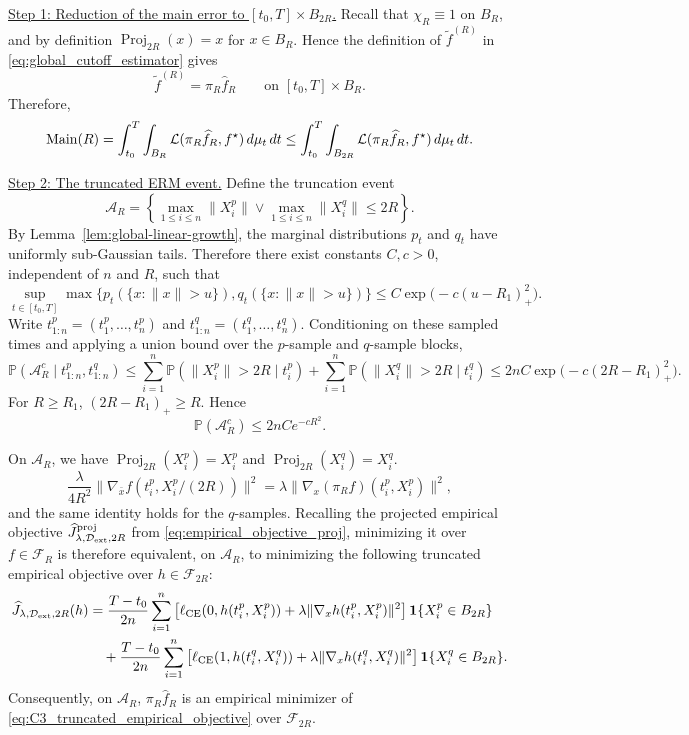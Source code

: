 \documentclass[11pt]{article}
\theoremstyle{plain}
\theoremstyle{definition}
\theoremstyle{remark}
\newcommand{\proofstep}[1]{\par\medskip\noindent\uline{#1}}
\begin{document}
\proofstep{Step 1: Reduction of the main error to \([t_0,T]\times B_{2R}\).}
Recall that \(\chi_R\equiv1\) on \(B_R\), and by definition
\(\operatorname{Proj}_{2R}(x)=x\) for \(x\in B_R\). Hence
the definition of \(\widetilde f^{(R)}\) in
\eqref{eq:global_cutoff_estimator} gives
\[
\widetilde f^{(R)}=\pi_R\widehat f_R
\qquad\text{on }[t_0,T]\times B_R.
\]
Therefore,
\begin{equation}
\label{eq:C3_main_reduction}
{\rm Main}(R)
=
\int_{t_0}^T\int_{B_R}
\mathcal L(\pi_R\widehat f_R,f^\star)\,d\mu_t\,dt
\le
\int_{t_0}^T\int_{B_{2R}}
\mathcal L(\pi_R\widehat f_R,f^\star)\,d\mu_t\,dt.
\end{equation}
\proofstep{Step 2: The truncated ERM event.}
Define the truncation event
\[
\mathcal A_R
=
\left\{
\max_{1\le i\le n}\|X_i^p\|
\vee
\max_{1\le i\le n}\|X_i^q\|
\le 2R
\right\}.
\]
By Lemma~\ref{lem:global-linear-growth}, the marginal distributions
\(p_t\) and \(q_t\) have uniformly sub-Gaussian tails. Therefore there exist
constants \(C,c>0\), independent of \(n\) and \(R\), such that
\[
\sup_{t\in[t_0,T]}
\max\Big\{p_t(\{x:\|x\|>u\}),q_t(\{x:\|x\|>u\})\Big\}
\le
C\exp\Big(-c(u-R_1)_+^2\Big).
\]
Write \(t_{1:n}^p=(t_1^p,\ldots,t_n^p)\) and
\(t_{1:n}^q=(t_1^q,\ldots,t_n^q)\).
Conditioning on these sampled times and applying a union bound over the
\(p\)-sample and \(q\)-sample blocks,
\[
\mathbb P(\mathcal A_R^c\mid t_{1:n}^p,t_{1:n}^q)
\le
\sum_{i=1}^n
\mathbb P(\|X_i^p\|>2R\mid t_i^p)
+
\sum_{i=1}^n
\mathbb P(\|X_i^q\|>2R\mid t_i^q)
\le
2nC\exp\Big(-c(2R-R_1)_+^2\Big).
\]
For \(R\ge R_1\), \((2R-R_1)_+\ge R\). Hence
\begin{equation}
\label{eq:C3_truncation_event_tail_prob}
\mathbb P(\mathcal A_R^c)
\le
2nC e^{-cR^2}.
\end{equation}

On \(\mathcal A_R\), we have \(\operatorname{Proj}_{2R}(X_i^p)=X_i^p\) and
\(\operatorname{Proj}_{2R}(X_i^q)=X_i^q\).
\[
\frac{\lambda}{4R^2}
\|\nabla_{\bar x}f(t_i^p,X_i^p/(2R))\|^2
=\lambda\|\nabla_x(\pi_R f)(t_i^p,X_i^p)\|^2,
\]
and the same identity holds for the \(q\)-samples.
Recalling the projected empirical objective
\(\widehat J^{\rm proj}_{\lambda,\mathcal D_{\rm ext},2R}\) from
\eqref{eq:empirical_objective_proj}, minimizing it over
\(f\in\mathcal F_R\) is therefore equivalent, on \(\mathcal A_R\), to
minimizing the following truncated empirical objective over
\(h\in\mathcal F_{2R}\):
\begin{equation}
\label{eq:C3_truncated_empirical_objective}
\begin{aligned}
\widehat J_{\lambda,\mathcal D_{\rm ext},2R}(h)
&=
\frac{T-t_0}{2n}\sum_{i=1}^n
\left[
\ell_{\rm CE}(0,h(t_i^p,X_i^p))
+
\lambda\|\nabla_xh(t_i^p,X_i^p)\|^2
\right]\mathbf 1\{X_i^p\in B_{2R}\}
\\
&\quad+
\frac{T-t_0}{2n}\sum_{i=1}^n
\left[
\ell_{\rm CE}(1,h(t_i^q,X_i^q))
+
\lambda\|\nabla_xh(t_i^q,X_i^q)\|^2
\right]\mathbf 1\{X_i^q\in B_{2R}\}.
\end{aligned}
\end{equation}
Consequently, on \(\mathcal A_R\), \(\pi_R\widehat f_R\)
is an empirical minimizer of
\eqref{eq:C3_truncated_empirical_objective} over \(\mathcal F_{2R}\).
\end{document}
